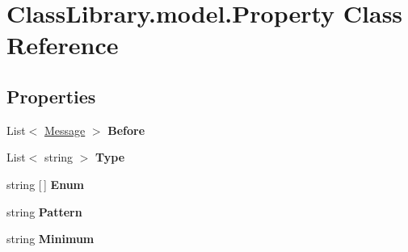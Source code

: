 \hypertarget{class_class_library_1_1model_1_1_property}{}\section{Class\+Library.\+model.\+Property Class Reference}
\label{class_class_library_1_1model_1_1_property}
\subsection*{Properties}
\begin{DoxyCompactItemize}
\item 
\mbox{\label{class_class_library_1_1model_1_1_property_ad69126781c383a7c3b6c4605a3144046}} 
List$<$ \mbox{\hyperlink{class_class_library_1_1model_1_1_message}{Message}} $>$ {\bfseries Before}
\item 
\mbox{\label{class_class_library_1_1model_1_1_property_ad1c572e6e2cd65951287611cd1eb3d86}} 
List$<$ string $>$ {\bfseries Type}
\item 
\mbox{\label{class_class_library_1_1model_1_1_property_a5d74a418084c3cd239bff23325f91268}} 
string \mbox{[}$\,$\mbox{]} {\bfseries Enum}
\item 
\mbox{\label{class_class_library_1_1model_1_1_property_a8a4345b5f7599f9c1b02b4183e2e3ee6}} 
string {\bfseries Pattern}
\item 
\mbox{\label{class_class_library_1_1model_1_1_property_afb3d259db0d7a9f5abff79ac2befb29c}} 
string {\bfseries Minimum}
\item 
\mbox{\label{class_class_library_1_1model_1_1_property_afa05c0a8ffd9f25b1ef8812619067557}} 

\end{DoxyCompactItemize}
